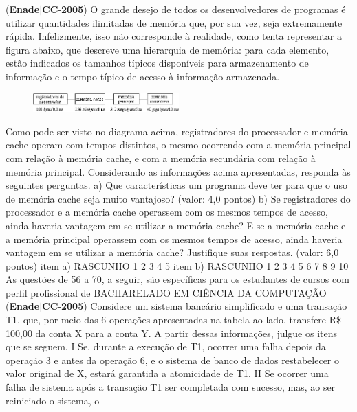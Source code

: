 \documentclass{exam}
\begin{document}
\begin{questions}
\begin{enumerate}[label=\alph*)]
	\end{enumerate}

\question (\textbf{Enade}$|$\textbf{CC}-\textbf{2005}) O grande desejo de todos os desenvolvedores de programas é utilizar quantidades ilimitadas de memória que, por sua vez,
seja extremamente rápida. Infelizmente, isso não corresponde à realidade, como tenta representar a figura abaixo, que descreve
uma hierarquia de memória: para cada elemento, estão indicados os tamanhos típicos disponíveis para armazenamento de
informação e o tempo típico de acesso à informação armazenada.
\begin{figure}[H]
	\begin{center}
		\includegraphics[width=0.5\textwidth]{CIENCIA_DA_COMPUTACAO_Prova2005-utf8_figuras/fig-0019.jpg}
	\end{center}
\end{figure}
Como pode ser visto no diagrama acima, registradores do processador e memória cache operam com tempos distintos, o
mesmo ocorrendo com a memória principal com relação à memória cache, e com a memória secundária com relação à memória
principal.
Considerando as informações acima apresentadas, responda às seguintes perguntas.
a) Que características um programa deve ter para que o uso de memória cache seja muito vantajoso? (valor: 4,0 pontos)
b) Se registradores do processador e a memória cache operassem com os mesmos tempos de acesso, ainda haveria vantagem em se
utilizar a memória cache? E se a memória cache e a memória principal operassem com os mesmos tempos de acesso, ainda haveria
vantagem em se utilizar a memória cache? Justifique suas respostas. (valor: 6,0 pontos)
item a) RASCUNHO
1
2
3
4
5
item b) RASCUNHO
1
2
3
4
5
6
7
8
9
10
As questões de 56 a 70, a seguir, são específicas para os estudantes de cursos com perfil profissional de
BACHARELADO EM CIÊNCIA DA COMPUTAÇÃO
\question (\textbf{Enade}$|$\textbf{CC}-\textbf{2005}) Considere um sistema bancário
simplificado e uma transação T1,
que, por meio das 6 operações
apresentadas na tabela ao lado,
transfere R\$ 100,00 da conta X
para a conta Y. A partir dessas
informações, julgue os itens que se
seguem.
I Se, durante a execução de T1,
ocorrer uma falha depois da
operação 3 e antes da operação
6, e o sistema de banco de dados
restabelecer o valor original
de X, estará garantida a atomicidade de T1.
II Se ocorrer uma falha de sistema após a transação T1 ser
completada com sucesso, mas, ao ser reiniciado o sistema, o

\end{questions}
\end{document}
